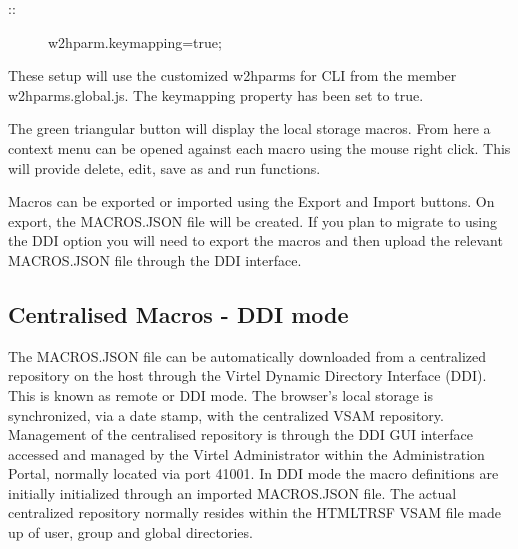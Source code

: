 \documentclass[letterpaper,10pt,english]{sphinxmanual}
\begin{document}
\begin{description}
\item[{::}] \leavevmode
w2hparm.keymapping=true;

\end{description}


These setup will use the customized w2hparms for CLI from the member w2hparms.global.js. The keymapping property has been set to true.

\ignorespaces 
{}

The green triangular button will display the local storage macros. From here a context menu can be opened against each macro using the mouse right click. This will provide delete, edit, save as and run functions.



\ignorespaces 
{}

Macros can be exported or imported using the Export and Import buttons. On export, the MACROS.JSON file will be created. If you plan to migrate to using the DDI option you will need to export the macros and then upload the relevant MACROS.JSON file through the DDI interface.

\ignorespaces 

\subsection{Centralised Macros - DDI mode}
\label{\detokenize{Customization:centralised-macros-ddi-mode}}\label{\detokenize{Customization:index-85}}
The MACROS.JSON file can be automatically downloaded from a centralized repository on the host through the Virtel Dynamic Directory Interface (DDI). This is known as remote or DDI mode. The browser’s local storage is synchronized, via a date stamp, with the centralized VSAM repository. Management of the centralised repository is through the DDI GUI interface accessed and managed by the Virtel Administrator within the Administration Portal, normally located via port 41001. In DDI mode the macro definitions are initially initialized through an imported MACROS.JSON file. The actual centralized repository normally resides within the HTMLTRSF VSAM file made up of user, group and global directories.
\end{document}

